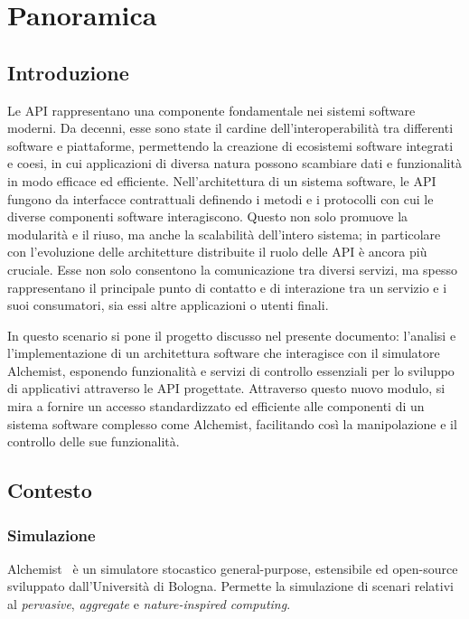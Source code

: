 \chapter{Panoramica}\label{chap:introduction}
\section{Introduzione}\label{sec:background}
Le \ac{API} rappresentano una componente fondamentale nei sistemi software moderni. Da decenni, esse sono state il cardine dell'interoperabilità tra differenti software e piattaforme, permettendo la
creazione di ecosistemi software integrati e coesi, in cui applicazioni di diversa natura possono scambiare dati e funzionalità in modo efficace ed efficiente.
Nell'architettura di un sistema software, le \ac{API} fungono da interfacce contrattuali definendo i metodi e i protocolli con cui le diverse componenti software interagiscono. Questo non solo 
promuove la modularità e il riuso, ma anche la scalabilità dell'intero sistema; in particolare con l'evoluzione delle architetture distribuite il ruolo delle \ac{API} è ancora più cruciale.
Esse non solo consentono la comunicazione tra diversi servizi, ma spesso rappresentano il principale punto di contatto e di interazione tra un servizio e i suoi consumatori, sia essi altre applicazioni
o utenti finali.

In questo scenario si pone il progetto discusso nel presente documento: l'analisi e l'implementazione di un architettura software che interagisce con il simulatore Alchemist, esponendo funzionalità e
servizi di controllo essenziali per lo sviluppo di applicativi attraverso le API progettate.
Attraverso questo nuovo modulo, si mira a fornire un accesso standardizzato ed efficiente alle componenti di un sistema software complesso come Alchemist, facilitando così la manipolazione e il controllo
delle sue funzionalità.

\section{Contesto}\label{sec:context}
\subsection{Simulazione}\label{ssec:alchemist}
Alchemist~\cite{alchemist} è un simulatore stocastico general-purpose, estensibile ed open-source sviluppato dall'Università di Bologna. Permette la simulazione di scenari relativi al
\textit{pervasive}, \textit{aggregate} e \textit{nature-inspired computing}.

